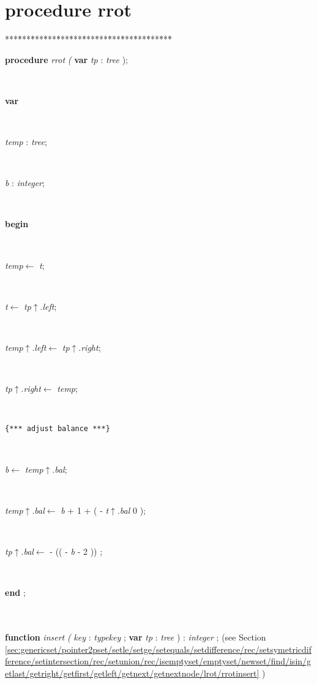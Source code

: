 \documentclass[10pt, a4paper]{article}
\begin{document}
\section{procedure rrot}\label{sec:genericset/pointer2pset/setle/setge/setequals/setdifference/rec/setsymetricdifference/setintersection/rec/setunion/rec/isemptyset/emptyset/newset/find/isin/getlast/getright/getfirst/getleft/getnext/getnextnode/lrotrrot}

\begin{tabbing}
***\=***\=***\=***\=***\=***\=***\=***\=***\=***\=***\=***\=***\=\kill
\parbox{14cm}{\textsf {\textbf {procedure } \textsf{ \textit{rrot} \textit{(}  } \textbf{ var } \textsf{ \textit{tp}  : \textit{tree}  );}}}\\
\+\parbox{14cm}{\textsf{\textbf{var} }}\\
\parbox{14cm}{\textsf{\textit{temp} : \textit{tree}}; }\\
\parbox{14cm}{\textsf{\textit{b} : \textit{integer}}; }\\
\-\<\+\parbox{14cm}{\textsf{\textbf{begin} }}\\
\parbox{14cm}{\textsf{\textit{temp}$\leftarrow$ \textit{t}}; }\\
\parbox{14cm}{\textsf{\textit{t}$\leftarrow$ \textit{tp}$\uparrow$.\textit{left}}; }\\
\parbox{14cm}{\textsf{\textit{temp}$\uparrow$.\textit{left}$\leftarrow$ \textit{tp}$\uparrow$.\textit{right}}; }\\
\parbox{14cm}{\textsf{\textit{tp}$\uparrow$.\textit{right}$\leftarrow$ \textit{temp}}; }\\
\parbox{14cm}{\texttt{\small{\{*** adjust balance ***\}}}}\\
\parbox{14cm}{\textsf{\textit{b}$\leftarrow$ \textit{temp}$\uparrow$.\textit{bal}}; }\\
\parbox{14cm}{\textsf{\textit{temp}$\uparrow$.\textit{bal}$\leftarrow$ \textit{b} + 1 + ( -  \textit{t}$\uparrow$.\textit{bal}  0  )}; }\\
\parbox{14cm}{\textsf{\textit{tp}$\uparrow$.\textit{bal}$\leftarrow$  -  (( -  \textit{b} - 2 )) }; }\\
\<\-\parbox{14cm}{\textsf{\textbf{end} ;}}\\
\\
\+\textsf{\textbf{function}  \textit{insert} \textit{(}  \textit{key}  : \textit{typekey} ; \textbf{var}  \textit{tp}  : \textit{tree}  ) : \textit{integer} ;} (see Section \ref{sec:genericset/pointer2pset/setle/setge/setequals/setdifference/rec/setsymetricdifference/setintersection/rec/setunion/rec/isemptyset/emptyset/newset/find/isin/getlast/getright/getfirst/getleft/getnext/getnextnode/lrot/rrotinsert} )\\
\end{tabbing}
\end{document}
